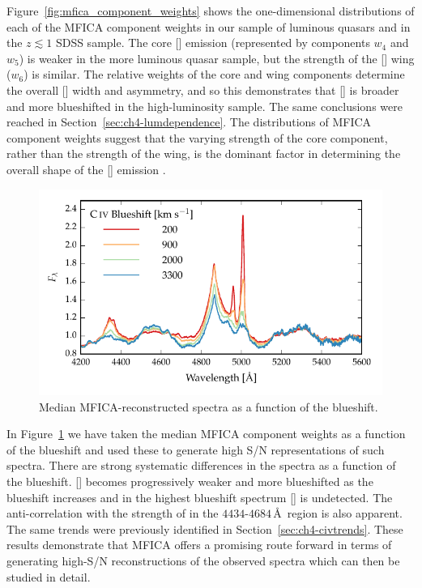 Figure~\ref{fig:mfica_component_weights} shows the one-dimensional distributions of each of the MFICA component weights in our sample of luminous quasars and in the $z \lesssim 1$ SDSS sample. 
The core [] emission (represented by components $w_4$ and $w_5$) is weaker in the more luminous quasar sample, but the strength of the [] wing ($w_6$) is similar.
The relative weights of the core and wing components determine the overall [] width and asymmetry, and so this demonstrates that [] is broader and more blueshifted in the high-luminosity sample.
The same conclusions were reached in Section~\ref{sec:ch4-lumdependence}. 
The distributions of MFICA component weights suggest that the varying strength of the core component, rather than the strength of the wing, is the dominant factor in determining the overall shape of the [] emission \citep[e.g.][]{shen14}. 

\begin{figure}
    \centering
    \includegraphics[width=\columnwidth]{figures/chapter04/mfica_composites.pdf} 
    \caption[{Median MFICA-reconstructed spectra as a function of the  blueshift.}]{Median MFICA-reconstructed spectra as a function of the  blueshift.}     
    \label{fig:mfica_composites}
\end{figure}

In Figure~\ref{fig:mfica_composites} we have taken the median MFICA component weights as a function of the  blueshift and used these to generate high S/N representations of such spectra. 
There are strong systematic differences in the spectra as a function of the  blueshift. 
[] becomes progressively weaker and more blueshifted as the  blueshift increases and in the highest  blueshift spectrum [] is undetected. 
The anti-correlation with the strength of  in the $4434$-$4684$\,\AA\, region is also apparent. 
The same trends were previously identified in Section~\ref{sec:ch4-civtrends}.
These results demonstrate that MFICA offers a promising route forward in terms of generating high-S/N reconstructions of the observed spectra which can then be studied in detail. 

